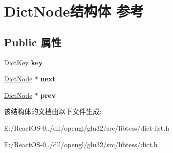 \hypertarget{struct_dict_node}{}\section{Dict\+Node结构体 参考}
\label{struct_dict_node}
\subsection*{Public 属性}
\begin{DoxyCompactItemize}
\item 
\mbox{\label{struct_dict_node_ac15f33e27157ff2bf067801a1d26629c}} 
\hyperlink{interfacevoid}{Dict\+Key} {\bfseries key}
\item 
\mbox{\label{struct_dict_node_af9a2ffdc784e335bb3f3f6c1acfbdd51}} 
\hyperlink{struct_dict_node}{Dict\+Node} $\ast$ {\bfseries next}
\item 
\mbox{\label{struct_dict_node_a3e46ca3b6909daee535d7534f27d6e9e}} 
\hyperlink{struct_dict_node}{Dict\+Node} $\ast$ {\bfseries prev}
\end{DoxyCompactItemize}


该结构体的文档由以下文件生成\+:\begin{DoxyCompactItemize}
\item 
E\+:/\+React\+O\+S-\/0../dll/opengl/glu32/src/libtess/dict-\/list.\+h\item 
E\+:/\+React\+O\+S-\/0../dll/opengl/glu32/src/libtess/dict.\+h\end{DoxyCompactItemize}

